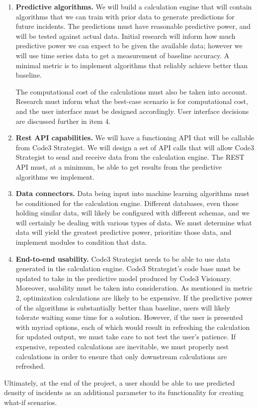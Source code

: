 \documentclass[onecolumn, draftclsnofoot,10pt, compsoc]{IEEEtran}
\begin{document}
\begin{enumerate}
    \item \textbf{Predictive algorithms.} 
    We will build a calculation engine that will contain algorithms that we can train with prior data to generate predictions for future incidents. 
    The predictions must have reasonable predictive power, and will be tested against actual data. 
    Initial research will inform how much predictive power we can expect to be given the available data;
    however we will use time series data to get a measurement of baseline accuracy. 
    A minimal metric is to implement algorithms that reliably achieve better than baseline. \par
    
    The computational cost of the calculations must also be taken into account.
    Research must inform what the best-case scenario is for computational cost, and the user interface must be designed accordingly. User interface decisions are discussed further in item 4.
    
    \item \textbf{Rest API capabilities.} We will have a functioning API that will be callable from Code3 Strategist. We will design a set of API calls that will allow Code3 Strategist to send and receive data from the calculation engine. The REST API must, at a minimum, be able to get results from the predictive algorithms we implement.
    
    \item \textbf{Data connectors.} Data being input into machine learning algorithms must be conditioned for the calculation engine. Different databases, even those holding similar data, will likely be configured with different schemas, and we will certainly be dealing with various types of data. We must determine what data will yield the greatest predictive power, prioritize those data, and implement modules to condition that data. 
    
    \item \textbf{End-to-end usability.} Code3 Strategist needs to be able to use data generated in the calculation engine. 
    Code3 Strategist's code base must be updated to take in the predictive model produced by Code3 Visionary. 
    Moreover, usability must be taken into consideration.
    As mentioned in metric 2, optimization calculations are likely to be expensive.
    If the predictive power of the algorithms is substantially better than baseline, users will likely tolerate waiting some time for a solution.
    However, if the user is presented with myriad options, each of which would result in refreshing the calculation for updated output, we must take care to not test the user's patience.
    If expensive, repeated calculations are inevitable, we must properly nest calculations in order to ensure that only downstream calculations are refreshed.
    
\end{enumerate}
Ultimately, at the end of the project, a user should be able to use predicted density of incidents as an additional parameter to its functionality for creating what-if scenarios. 
\end{document}
